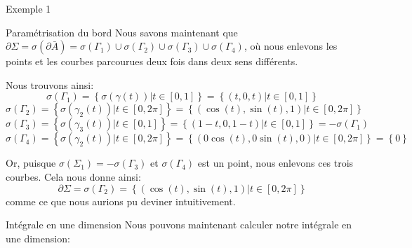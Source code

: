 \documentclass[a4paper]{article}
\begin{document}
\begin{parag}{Exemple 1}
\begin{subparag}{Paramétrisation du bord}
        Nous savons maintenant que $\partial \Sigma = \sigma\left(\partial \bar{A}\right) = \sigma\left(\Gamma_1\right) \cup \sigma\left(\Gamma_2\right) \cup \sigma\left(\Gamma_3\right) \cup \sigma\left(\Gamma_4\right)$, où nous enlevons les points et les courbes parcourues deux fois dans deux sens différents.

        Nous trouvons ainsi: 
        \[\sigma\left(\Gamma_1\right) = \left\{\sigma\left(\gamma\left(t\right)\right) | t \in \left[0, 1\right]\right\} = \left\{\left(t, 0, t\right) | t \in \left[0, 1\right]\right\}\] 
        \[\sigma\left(\Gamma_2\right) = \left\{\sigma\left(\gamma_2\left(t\right)\right) | t \in \left[0, 2\pi\right]\right\} = \left\{\left(\cos\left(t\right), \sin\left(t\right), 1\right) | t \in \left[0, 2\pi\right]\right\}\]
        \[\sigma\left(\Gamma_3\right) = \left\{\sigma\left(\gamma_3\left(t\right)\right) | t \in \left[0, 1\right]\right\} = \left\{\left(1 - t, 0, 1-t\right) | t \in \left[0, 1\right]\right\} = -\sigma\left(\Gamma_1\right)\]
        \[\sigma\left(\Gamma_4\right) = \left\{\sigma\left(\gamma_2\left(t\right)\right) | t \in \left[0, 2\pi\right]\right\} = \left\{\left(0\cos\left(t\right), 0\sin\left(t\right), 0\right) | t \in \left[0, 2\pi\right]\right\} = \left\{0\right\}\]
        
        Or, puisque $\sigma\left(\Sigma_1\right) = -\sigma\left(\Gamma_3\right)$ et $\sigma\left(\Gamma_4\right)$ est un point, nous enlevons ces trois courbes. Cela nous donne ainsi:
        \[\partial \Sigma = \sigma\left(\Gamma_2\right) = \left\{\left(\cos\left(t\right), \sin\left(t\right), 1\right) | t \in \left[0, 2\pi\right]\right\}\]
        comme ce que nous aurions pu deviner intuitivement.
    \end{subparag}

    \begin{subparag}{Intégrale en une dimension}
        Nous pouvons maintenant calculer notre intégrale en une dimension: 
    \end{subparag}
\end{parag}
\end{document}
